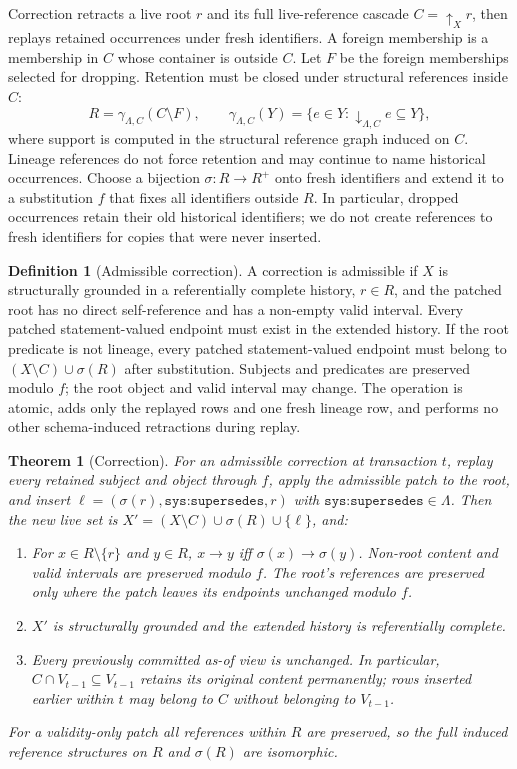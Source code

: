 \documentclass[11pt]{article}
\theoremstyle{plain}
\newtheorem{theorem}{Theorem}
\theoremstyle{definition}
\newtheorem{definition}{Definition}
\theoremstyle{remark}
\newcommand{\refs}{\rightarrow}          %
\newcommand{\supp}{{\downarrow}}          %
\newcommand{\dep}{{\uparrow}}            %
\newcommand{\core}{\gamma}               %
\newcommand{\sys}[1]{\texttt{sys:#1}}
\newcommand{\Lin}{\Lambda}               %
\begin{document}
Correction retracts a live root $r$ and its full live-reference cascade
$C=\dep_X r$, then replays retained occurrences under fresh identifiers.
A foreign membership is a membership in $C$ whose container is outside $C$.
Let $F$ be the foreign memberships selected for dropping. Retention must be
closed under structural references inside $C$:
\[
 R=\core_{\Lin,C}(C\setminus F),\qquad
 \core_{\Lin,C}(Y)=\{e\in Y:\supp_{\Lin,C}e\subseteq Y\},
\]
where support is computed in the structural reference graph induced on $C$.
Lineage references do not force retention and may continue to name historical
occurrences. Choose a bijection $\sigma:R\to R^{+}$ onto fresh identifiers and
extend it to a substitution $f$ that fixes all identifiers outside $R$.
In particular, dropped occurrences retain their old historical identifiers;
we do not create references to fresh identifiers for copies that were never inserted.

\begin{definition}[Admissible correction]
A correction is admissible if $X$ is structurally grounded in a referentially
complete history, $r\in R$, and the patched root has no direct self-reference
and has a non-empty valid interval. Every patched statement-valued endpoint
must exist in the extended history. If the root predicate is not lineage,
every patched statement-valued endpoint must belong to
$(X\setminus C)\cup\sigma(R)$ after substitution. Subjects and predicates are
preserved modulo $f$; the root object and valid interval may change.
The operation is atomic, adds only the replayed rows and one fresh lineage row,
and performs no other schema-induced retractions during replay.
\end{definition}

\begin{theorem}[Correction]\label{thm:supersede}
For an admissible correction at transaction $t$, replay every retained subject
and object through $f$, apply the admissible patch to the root, and insert
$\ell=(\sigma(r),\sys{supersedes},r)$ with $\sys{supersedes}\in\Lin$.
Then the new live set is
$X'=(X\setminus C)\cup\sigma(R)\cup\{\ell\}$, and:
\begin{enumerate}
\item For $x\in R\setminus\{r\}$ and $y\in R$,
  $x\refs y$ iff $\sigma(x)\refs\sigma(y)$. Non-root content and valid
  intervals are preserved modulo $f$. The root's references are preserved only
  where the patch leaves its endpoints unchanged modulo $f$.
\item $X'$ is structurally grounded and the extended history is referentially complete.
\item Every previously committed as-of view is unchanged. In particular,
  $C\cap V_{t-1}\subseteq V_{t-1}$ retains its original content permanently;
  rows inserted earlier within $t$ may belong to $C$ without belonging to $V_{t-1}$.
\end{enumerate}
For a validity-only patch all references within $R$ are preserved, so the
full induced reference structures on $R$ and $\sigma(R)$ are isomorphic.
\end{theorem}
\end{document}
